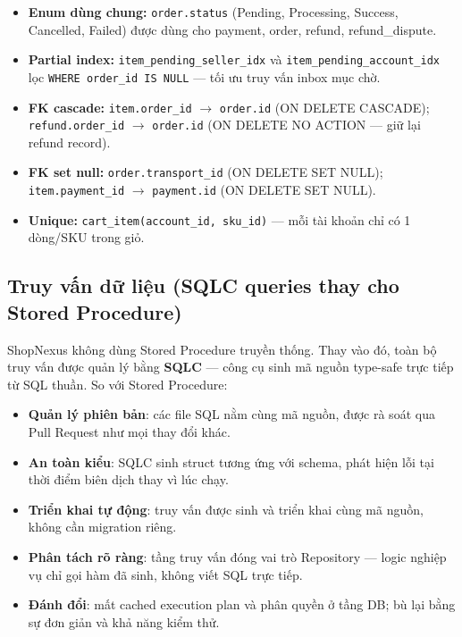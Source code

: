 \begin{itemize}[nosep]
    \item \textbf{Enum dùng chung:} \texttt{order.status} (Pending, Processing, Success, Cancelled, Failed) được dùng cho payment, order, refund, refund\_dispute.
    \item \textbf{Partial index:} \texttt{item\_pending\_seller\_idx} và \texttt{item\_pending\_account\_idx} lọc \texttt{WHERE order\_id IS NULL} --- tối ưu truy vấn inbox mục chờ.
    \item \textbf{FK cascade:} \texttt{item.order\_id} $\to$ \texttt{order.id} (ON DELETE CASCADE); \texttt{refund.order\_id} $\to$ \texttt{order.id} (ON DELETE NO ACTION --- giữ lại refund record).
    \item \textbf{FK set null:} \texttt{order.transport\_id} (ON DELETE SET NULL); \texttt{item.payment\_id} $\to$ \texttt{payment\allowbreak.id} (ON DELETE SET NULL).
    \item \textbf{Unique:} \texttt{cart\_item(account\_id, sku\_id)} --- mỗi tài khoản chỉ có 1 dòng/SKU trong giỏ.
\end{itemize}

\subsection{Truy vấn dữ liệu (SQLC queries thay cho Stored Procedure)}
\label{subsec:db-sqlc}

ShopNexus không dùng Stored Procedure truyền thống. Thay vào đó, toàn bộ truy vấn được quản lý bằng \textbf{SQLC} --- công cụ sinh mã nguồn type-safe trực tiếp từ SQL thuần. So với Stored Procedure:

\begin{itemize}[nosep]
    \item \textbf{Quản lý phiên bản}: các file SQL nằm cùng mã nguồn, được rà soát qua Pull Request như mọi thay đổi khác.
    \item \textbf{An toàn kiểu}: SQLC sinh struct tương ứng với schema, phát hiện lỗi tại thời điểm biên dịch thay vì lúc chạy.
    \item \textbf{Triển khai tự động}: truy vấn được sinh và triển khai cùng mã nguồn, không cần migration riêng.
    \item \textbf{Phân tách rõ ràng}: tầng truy vấn đóng vai trò Repository --- logic nghiệp vụ chỉ gọi hàm đã sinh, không viết SQL trực tiếp.
    \item \textbf{Đánh đổi}: mất cached execution plan và phân quyền ở tầng DB; bù lại bằng sự đơn giản và khả năng kiểm thử.
\end{itemize}

